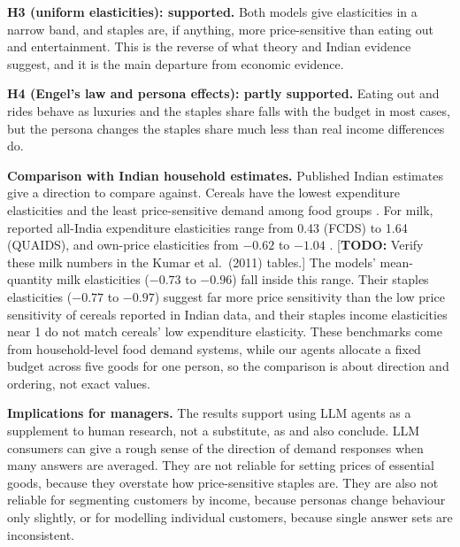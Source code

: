 \documentclass[11pt,a4paper]{article}
\newcommand{\todo}[1]{\textcolor{red!70!black}{[\textbf{TODO:} #1]}}
\begin{document}
\textbf{H3 (uniform elasticities): supported.} Both models give elasticities in a narrow band, and staples are, if anything, more price-sensitive than eating out and entertainment. This is the reverse of what theory and Indian evidence suggest, and it is the main departure from economic evidence.

\textbf{H4 (Engel's law and persona effects): partly supported.} Eating out and rides behave as luxuries and the staples share falls with the budget in most cases, but the persona changes the staples share much less than real income differences do.

\textbf{Comparison with Indian household estimates.} Published Indian estimates give a direction to compare against. Cereals have the lowest expenditure elasticities and the least price-sensitive demand among food groups \citep{kumar2011}. For milk, reported all-India expenditure elasticities range from 0.43 (FCDS) to 1.64 (QUAIDS), and own-price elasticities from $-0.62$ to $-1.04$ \citep[as summarised in][]{nddbmilk}. \todo{Verify these milk numbers in the Kumar et al.\ (2011) tables.} The models' mean-quantity milk elasticities ($-0.73$ to $-0.96$) fall inside this range. Their staples elasticities ($-0.77$ to $-0.97$) suggest far more price sensitivity than the low price sensitivity of cereals reported in Indian data, and their staples income elasticities near 1 do not match cereals' low expenditure elasticity. These benchmarks come from household-level food demand systems, while our agents allocate a fixed budget across five goods for one person, so the comparison is about direction and ordering, not exact values.

\textbf{Implications for managers.} The results support using LLM agents as a supplement to human research, not a substitute, as \citet{brand2023} and \citet{hoq2026} also conclude. LLM consumers can give a rough sense of the direction of demand responses when many answers are averaged. They are not reliable for setting prices of essential goods, because they overstate how price-sensitive staples are. They are also not reliable for segmenting customers by income, because personas change behaviour only slightly, or for modelling individual customers, because single answer sets are inconsistent.
\end{document}
